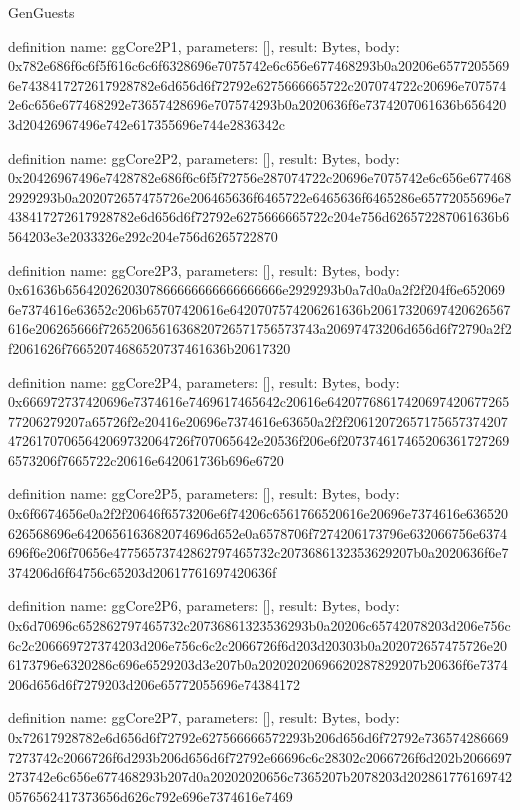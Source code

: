\begin{lexlean}{GenGuests}
\begin{semanticmodule}
definition{
  name: ggCore2P1,
  parameters: [],
  result: Bytes,
  body: 0x782e686f6c6f5f616c6c6f6328696e7075742e6c656e677468293b0a20206e65772055696e7438417272617928782e6d656d6f72792e6275666665722c207074722c20696e7075742e6c656e677468292e73657428696e707574293b0a2020636f6e7374207061636b6564203d20426967496e742e617355696e744e2836342c
}

definition{
  name: ggCore2P2,
  parameters: [],
  result: Bytes,
  body: 0x20426967496e7428782e686f6c6f5f72756e287074722c20696e7075742e6c656e6774682929293b0a202072657475726e206465636f6465722e6465636f6465286e65772055696e7438417272617928782e6d656d6f72792e6275666665722c204e756d626572287061636b6564203e3e2033326e292c204e756d6265722870
}

definition{
  name: ggCore2P3,
  parameters: [],
  result: Bytes,
  body: 0x61636b6564202620307866666666666666666e2929293b0a7d0a0a2f2f204f6e6520696e7374616e63652c206b65707420616e6420707574206261636b20617320697420626567616e206265666f7265206561636820726571756573743a20697473206d656d6f72790a2f2f2061626f76652074686520737461636b20617320
}

definition{
  name: ggCore2P4,
  parameters: [],
  result: Bytes,
  body: 0x666972737420696e7374616e7469617465642c20616e6420776861742069742067726577206279207a65726f2e20416e20696e7374616e63650a2f2f2061207265717565737420747261707065642069732064726f707065642e20536f206e6f2073746174652063617272696573206f7665722c20616e642061736b696e6720
}

definition{
  name: ggCore2P5,
  parameters: [],
  result: Bytes,
  body: 0x6f6674656e0a2f2f20646f6573206e6f74206c6561766520616e20696e7374616e636520626568696e6420656163682074696d652e0a6578706f7274206173796e632066756e6374696f6e206f70656e47756573742862797465732c2073686132353629207b0a2020636f6e7374206d6f64756c65203d20617761697420636f
}

definition{
  name: ggCore2P6,
  parameters: [],
  result: Bytes,
  body: 0x6d70696c652862797465732c20736861323536293b0a20206c65742078203d206e756c6c2c206669727374203d206e756c6c2c2066726f6d203d20303b0a202072657475726e206173796e6320286c696e6529203d3e207b0a20202020696620287829207b20636f6e7374206d656d6f7279203d206e65772055696e74384172
}

definition{
  name: ggCore2P7,
  parameters: [],
  result: Bytes,
  body: 0x72617928782e6d656d6f72792e627566666572293b206d656d6f72792e7365742866697273742c2066726f6d293b206d656d6f72792e66696c6c28302c2066726f6d202b2066697273742e6c656e677468293b207d0a20202020656c7365207b2078203d2028617761697420576562417373656d626c792e696e7374616e7469
}


\end{semanticmodule}
\end{lexlean}
